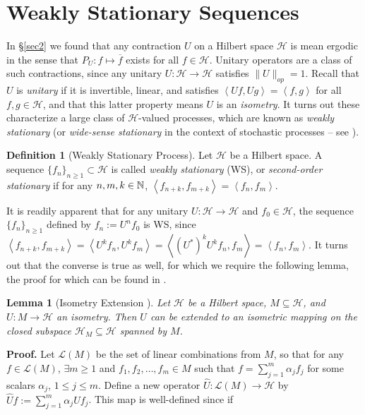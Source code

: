 \documentclass[11pt]{report}
\newcommand{\mc}[1]{\mathcal{#1}}
\newcommand{\ip}[2]{\left\langle#1,#2\right\rangle }
\newtheorem{lemma}{Lemma}[section]
\theoremstyle{definition}
\newtheorem{definition}{Definition}
\begin{document}
    \section{Weakly Stationary Sequences}\label{sec3} In  \S\ref{sec2} we
    found that any contraction $U$ on a Hilbert space $\mc{H}$ is mean ergodic
    in the sense that $P_U:f\mapsto \overline{f}$ exists for all $f\in\mc{H}$.
    Unitary operators are a class of such contractions, since any unitary
    $U:\mc{H}\rightarrow\mc{H}$ satisfies $\|U\|_{op}=1$. Recall that $U$ is
    \textit{unitary} if it is invertible, linear, and satisfies
    $\ip{Uf}{Ug}=\ip{f}{g}$ for all $f,g\in\mc{H}$, and that this latter
    property means $U$ is an \textit{isometry}. It turns out these characterize
    a large class of $\mc{H}$-valued processes, which are known as \textit{weakly
    stationary} (or \textit{wide-sense stationary} in the context of stochastic
    processes -- see \cite[ch.15]{Koralov_Sinai_2007}).
    \begin{definition}[Weakly Stationary Process]\label{def3} Let $\mc{H}$ be a
        Hilbert space. A sequence $\{f_n\}_{n\geq 1}\subset\mc{H}$ is called
        \textit{weakly stationary} (WS), or \textit{second-order stationary} if for
        any $n,m,k\in\mathbb{N}$, $\ip{f_{n+k}}{f_{m+k}}=\ip{f_n}{f_m}$.
    \end{definition}
    It is readily apparent that for any unitary $U:\mc{H}\rightarrow\mc{H}$ and
    $f_0\in\mc{H}$, the sequence $\{f_n\}_{n\geq 1}$ defined by $f_n:=U^nf_0$ is
    WS, since
    $\ip{f_{n+k}}{f_{m+k}}=\ip{U^kf_n}{U^kf_m}=\ip{(U^\ast)^kU^kf_n}{f_m}=\ip{f_n}{f_m}$.
    It turns out that the converse is true as well, for which we require the
    following lemma, the proof for which can be found in \cite[lemma 2.1.2]{Weber_2000}.
    \begin{lemma}[Isometry Extension {\cite[lemma 2.1.2]{Weber_2000}}]\label{lem5}
        Let $\mc{H}$ be a Hilbert space, $M\subseteq\mc{H}$, and
        $U:M\rightarrow\mc{H}$ an isometry. Then $U$ can be extended to an
        isometric mapping on the closed subspace $\mc{H}_M\subseteq\mc{H}$
        spanned by $M$.  
    \end{lemma}
    \noindent\textbf{Proof.} Let $\mc{L}(M)$ be the set of linear combinations
    from $M$, so that for any $f\in\mc{L}(M)$, $\exists m\geq 1$ and
    $f_1,f_2,\dots,f_m\in M$ such that $f=\sum_{j=1}^m\alpha_j f_j$ for some
    scalars $\alpha_j$, $1\leq j\leq m$. Define a new operator
    $\hat{U}:\mc{L}(M)\rightarrow\mc{H}$ by
    $\hat{U}f:=\sum_{j=1}^m\alpha_jUf_j$. This map is well-defined since if
\end{document}
